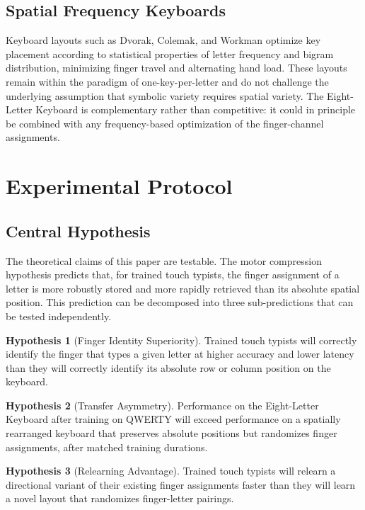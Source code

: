 \documentclass[12pt,a4paper]{article}
\theoremstyle{plain}
\theoremstyle{definition}
\newtheorem{hypothesis}{Hypothesis}
\theoremstyle{remark}
\begin{document}
\subsection{Spatial Frequency Keyboards}

Keyboard layouts such as Dvorak, Colemak, and Workman optimize key placement
according to statistical properties of letter frequency and bigram distribution,
minimizing finger travel and alternating hand load. These layouts remain within
the paradigm of one-key-per-letter and do not challenge the underlying
assumption that symbolic variety requires spatial variety. The Eight-Letter
Keyboard is complementary rather than competitive: it could in principle be
combined with any frequency-based optimization of the finger-channel assignments.

\section{Experimental Protocol}

\subsection{Central Hypothesis}

The theoretical claims of this paper are testable. The motor compression
hypothesis predicts that, for trained touch typists, the finger assignment of a
letter is more robustly stored and more rapidly retrieved than its absolute
spatial position. This prediction can be decomposed into three sub-predictions
that can be tested independently.

\begin{hypothesis}[Finger Identity Superiority]
Trained touch typists will correctly identify the finger that types a given
letter at higher accuracy and lower latency than they will correctly identify
its absolute row or column position on the keyboard.
\end{hypothesis}

\begin{hypothesis}[Transfer Asymmetry]
Performance on the Eight-Letter Keyboard after training on QWERTY will exceed
performance on a spatially rearranged keyboard that preserves absolute positions
but randomizes finger assignments, after matched training durations.
\end{hypothesis}

\begin{hypothesis}[Relearning Advantage]
Trained touch typists will relearn a directional variant of their existing
finger assignments faster than they will learn a novel layout that randomizes
finger-letter pairings.
\end{hypothesis}
\end{document}
